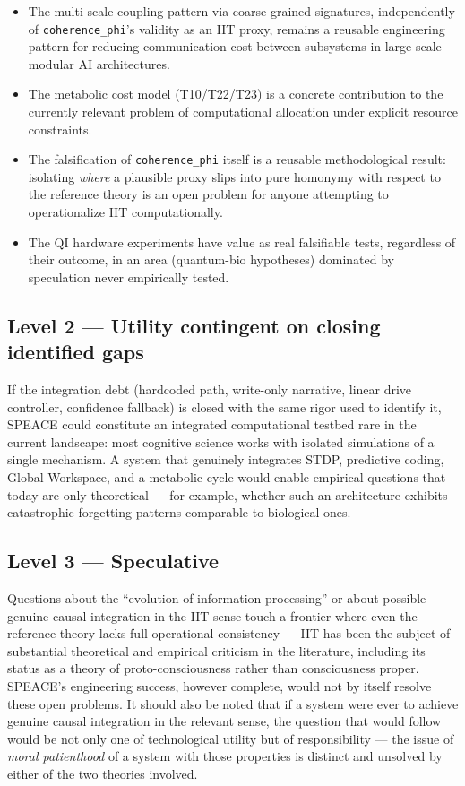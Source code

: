 \documentclass[11pt,a4paper]{article}
\newcommand{\code}[1]{\texttt{#1}}
\newcommand{\coherencephi}{\code{coherence\_phi}}
\begin{document}
\begin{itemize}
  \item The multi-scale coupling pattern via coarse-grained signatures, independently of \coherencephi{}'s validity as an IIT proxy, remains a reusable engineering pattern for reducing communication cost between subsystems in large-scale modular AI architectures.
  \item The metabolic cost model (T10/T22/T23) is a concrete contribution to the currently relevant problem of computational allocation under explicit resource constraints.
  \item The falsification of \coherencephi{} itself is a reusable methodological result: isolating \emph{where} a plausible proxy slips into pure homonymy with respect to the reference theory is an open problem for anyone attempting to operationalize IIT computationally.
  \item The QI hardware experiments have value as real falsifiable tests, regardless of their outcome, in an area (quantum-bio hypotheses) dominated by speculation never empirically tested.
\end{itemize}

\subsection{Level 2 --- Utility contingent on closing identified gaps}

If the integration debt (hardcoded path, write-only narrative, linear drive controller, confidence fallback) is closed with the same rigor used to identify it, SPEACE could constitute an integrated computational testbed rare in the current landscape: most cognitive science works with isolated simulations of a single mechanism. A system that genuinely integrates STDP, predictive coding, Global Workspace, and a metabolic cycle would enable empirical questions that today are only theoretical --- for example, whether such an architecture exhibits catastrophic forgetting patterns comparable to biological ones.

\subsection{Level 3 --- Speculative}

Questions about the ``evolution of information processing'' or about possible genuine causal integration in the IIT sense touch a frontier where even the reference theory lacks full operational consistency --- IIT has been the subject of substantial theoretical and empirical criticism in the literature, including its status as a theory of proto-consciousness rather than consciousness proper. SPEACE's engineering success, however complete, would not by itself resolve these open problems. It should also be noted that if a system were ever to achieve genuine causal integration in the relevant sense, the question that would follow would be not only one of technological utility but of responsibility --- the issue of \emph{moral patienthood} of a system with those properties is distinct and unsolved by either of the two theories involved.
\end{document}
